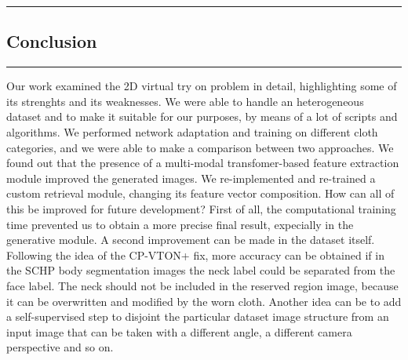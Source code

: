 \hfill

{\color{gray}\hrule}
\begin{center}
\section{Conclusion}
\end{center}
{\color{gray}\hrule}

\hfill

Our work examined the 2D virtual try on problem in detail, highlighting some of its strenghts and its weaknesses. We were able to handle an heterogeneous dataset and to make it suitable for our purposes, by means of a lot of scripts and algorithms. We performed network adaptation and training on different cloth categories, and we were able to make a comparison between two approaches. We found out that the presence of a multi-modal transfomer-based feature extraction module improved the generated images. We re-implemented and re-trained a custom retrieval module, changing its feature vector composition. 
How can all of this be improved for future development? First of all, the computational training time prevented us to obtain a more precise final result, expecially in  the generative module. A second improvement can be made in the dataset itself. Following the idea of the CP-VTON+ fix, more accuracy can be obtained if in the SCHP body segmentation images the neck label could be separated from the face label. The neck should not be included in the reserved region image, because it can be overwritten and modified by the worn cloth. Another idea can be to add a self-supervised step to disjoint the particular dataset image structure from an input image that can be taken with a different angle, a different camera perspective and so on.




